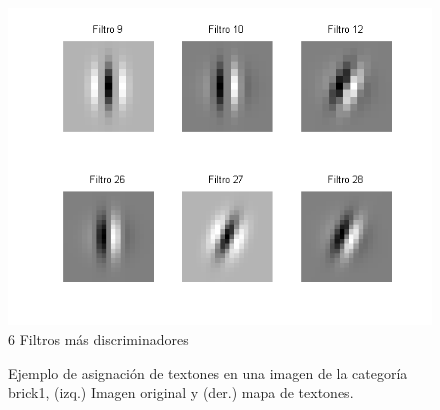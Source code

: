 \documentclass[10pt,twocolumn,letterpaper]{article}
\begin{document}
\begin{figure}[h]
\begin{center}
   \includegraphics[width=1\linewidth]{FiltrosIma.png}
\end{center}
   \caption{6 Filtros más discriminadores}
\label{fig:long}
\label{fig:onecol}
\end{figure}

\begin{figure}[ht]
\centering
   \caption{Ejemplo de asignación de textones en una imagen de la categoría brick1, (izq.) Imagen original y (der.) mapa de textones.}
\end{figure}
\end{document}
